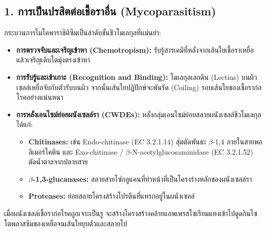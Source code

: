\subsection{1. การเป็นปรสิตต่อเชื้อราอื่น (Mycoparasitism)}
กระบวนการไมโคพาราซิติซึมเป็นลำดับขั้นชีวโมเลกุลที่แม่นยำ:
\begin{itemize}
    \item \textbf{การตรวจจับและเจริญเข้าหา (Chemotropism):}  รับรู้สารเคมีที่หลั่งจากเส้นใยเชื้อราเหยื่อ แล้วเจริญเติบโตมุ่งตรงเข้าหา
    \item \textbf{การรับรู้และเข้าเกาะ (Recognition and Binding):} โมเลกุลเลกติน (Lectins) บนผิวเซลล์เหยื่อจับกับตัวรับบนผิว  จากนั้นเส้นใยปฏิปักษ์จะพันรัด (Coiling) รอบเส้นใยของเชื้อราก่อโรคอย่างแน่นหนา
    \item \textbf{การหลั่งเอนไซม์ย่อยผนังเซลล์รา (CWDEs):}  หลั่งกลุ่มเอนไซม์ย่อยสลายผนังเซลล์ชีวโมเลกุล ได้แก่:
    \begin{itemize}
        \item \textbf{Chitinases:} เช่น Endo-chitinase (EC 3.2.1.14) สุ่มตัดพันธะ $\beta$-1,4 ภายในสายพอลิเมอร์ไคติน และ Exo-chitinase / $\beta$-N-acetylglucosaminidase (EC 3.2.1.52) ตัดน้ำตาลจากปลายสาย
        \item \textbf{$\beta$-1,3-glucanases:} สลายสายโซ่กลูแคนที่ทำหน้าที่เป็นโครงร่างหลักของผนังเซลล์รา
        \item \textbf{Proteases:} ย่อยสลายโครงสร้างโปรตีนที่แทรกอยู่ในผนังเซลล์
    \end{itemize}
\end{itemize}
เมื่อผนังเซลล์เชื้อราก่อโรคถูกเจาะเป็นรู  จะสร้างโครงสร้างคล้ายแอพเพรสโซเรียมแทงเข้าไปดูดกินไซโตพลาสซึมของเหยื่อจนเส้นใยยุบตัวและสลายไป

